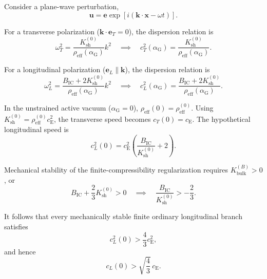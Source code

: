 Consider a plane-wave perturbation,
\begin{equation}
    \mathbf{u} = \mathbf{e} \exp\left[ i(\mathbf{k}\cdot\mathbf{x}-\omega t) \right].
\end{equation}

For a transverse polarization ($\mathbf{k}\cdot\mathbf{e}_T=0$), the dispersion relation is
\begin{equation}
    \omega_T^2 = \frac{ K_{\mathrm{sh}}^{(0)} }{ \rho_{\mathrm{eff}}(\alpha_{\mathrm{G}}) } k^2 \quad \implies \quad c_T^2(\alpha_{\mathrm{G}}) = \frac{ K_{\mathrm{sh}}^{(0)} }{ \rho_{\mathrm{eff}}(\alpha_{\mathrm{G}}) }.
\end{equation}

For a longitudinal polarization ($\mathbf{e}_L\parallel\mathbf{k}$), the dispersion relation is
\begin{equation}
    \omega_L^2 = \frac{ B_{\mathrm{IC}} + 2K_{\mathrm{sh}}^{(0)} }{ \rho_{\mathrm{eff}}(\alpha_{\mathrm{G}}) } k^2 \quad \implies \quad c_L^2(\alpha_{\mathrm{G}}) = \frac{ B_{\mathrm{IC}} + 2K_{\mathrm{sh}}^{(0)} }{ \rho_{\mathrm{eff}}(\alpha_{\mathrm{G}}) }.
\end{equation}

In the unstrained active vacuum ($\alpha_{\mathrm{G}}=0$), $\rho_{\mathrm{eff}}(0) = \rho_{\mathrm{eff}}^{(0)}$. Using $K_{\mathrm{sh}}^{(0)} = \rho_{\mathrm{eff}}^{(0)}c_{\mathrm{E}}^2$, the transverse speed becomes $c_T(0)=c_{\mathrm{E}}$. The hypothetical longitudinal speed is
\begin{equation}
    c_L^2(0) = c_{\mathrm{E}}^2 \left( \frac{B_{\mathrm{IC}}}{K_{\mathrm{sh}}^{(0)}} + 2 \right).
\end{equation}

Mechanical stability of the finite-compressibility regularization requires $K_{\mathrm{bulk}}^{(B)}>0$, or
\begin{equation}
    B_{\mathrm{IC}} + \frac{2}{3} K_{\mathrm{sh}}^{(0)} > 0 \quad \implies \quad \frac{B_{\mathrm{IC}}}{K_{\mathrm{sh}}^{(0)}} > -\frac{2}{3}.
\end{equation}

It follows that every mechanically stable finite ordinary longitudinal branch satisfies
\begin{equation}
    c_L^2(0) > \frac{4}{3} c_{\mathrm{E}}^2,
\end{equation}
and hence
\begin{equation}
    \boxed{ c_L(0) > \sqrt{\frac{4}{3}} \, c_{\mathrm{E}} }.
\end{equation}

